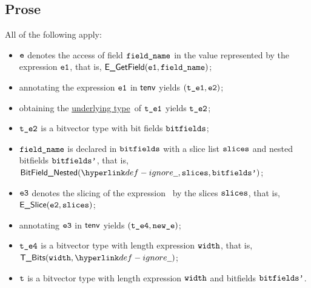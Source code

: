 \documentclass{book}
\newcommand\ProseOrTypeError[0]{\ProseTerminateAs{\TypeErrorConfig}}
\newcommand\underlyingtype[0]{\hyperlink{def-underlyingtype}{underlying type}}
\begin{document}
\subsection{Prose}
All of the following apply:
\begin{itemize}
  \item $\texttt{e}$ denotes the access of field $\texttt{field\_name}$ in the value represented by the expression $\texttt{e1}$, that is, $\textsf{E\_GetField}(\texttt{e1}, \texttt{field\_name})$;
  \item annotating the expression $\texttt{e1}$ in $\textsf{tenv}$ yields $(\texttt{t\_e1}, \texttt{e2})$\ProseOrTypeError;
  \item obtaining the \underlyingtype\ of $\texttt{t\_e1}$ yields $\texttt{t\_e2}$\ProseOrTypeError;
  \item $\texttt{t\_e2}$ is a bitvector type with bit fields $\texttt{bitfields}$;
  \item $\texttt{field\_name}$ is declared in $\texttt{bitfields}$ with a slice list $\texttt{slices}$ and nested bitfields $\texttt{bitfields'}$, that is,
        $\BitFieldNested(\Ignore, \slices, \bitfieldsp)$;
  \item $\texttt{e3}$ denotes the slicing of the expression \vetwo\ by the slices $\texttt{slices}$, that is, \\ $\textsf{E\_Slice}(\texttt{e2}, \texttt{slices})$;
  \item annotating $\texttt{e3}$ in $\textsf{tenv}$ yields $(\texttt{t\_e4}, \texttt{new\_e})$\ProseOrTypeError;
  \item $\texttt{t\_e4}$ is a bitvector type with length expression $\texttt{width}$, that is, $\TBits(\width, \Ignore)$;
  \item $\texttt{t}$ is a bitvector type with length expression $\texttt{width}$ and bitfields $\texttt{bitfields'}$.
\end{itemize}


\end{document}
